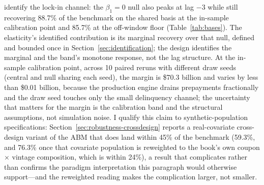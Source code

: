 \documentclass[12pt]{article}
\begin{document}
identify the lock-in channel: the $\beta_1 = 0$ null also peaks at lag $-3$ while still recovering 88.7\% of the benchmark on the shared basis at the in-sample calibration point and 85.7\% at the off-window floor (Table~\ref{tab:bases}). The elasticity's identified contribution is its marginal recovery over that null, defined and bounded once in Section~\ref{sec:identification}; the design identifies the marginal and the band's monotone response, not the lag structure. At the in-sample calibration point, across 10 paired reruns with different draw seeds (central and null sharing each seed), the margin is \$70.3 billion and varies by less than \$0.01 billion, because the production engine drains prepayments fractionally and the draw seed touches only the small delinquency channel; the uncertainty that matters for the margin is the calibration band and the structural assumptions, not simulation noise. I qualify this claim to synthetic-population specifications: Section~\ref{sec:robustness-crossdesign} reports a real-covariate cross-design variant of the ABM that does land within 45\% of the benchmark (59.3\%, and 76.3\% once that covariate population is reweighted to the book's own coupon $\times$ vintage composition, which is within 24\%), a result that complicates rather than confirms the paradigm interpretation this paragraph would otherwise support---and the reweighted reading makes the complication larger, not smaller.
\end{document}
